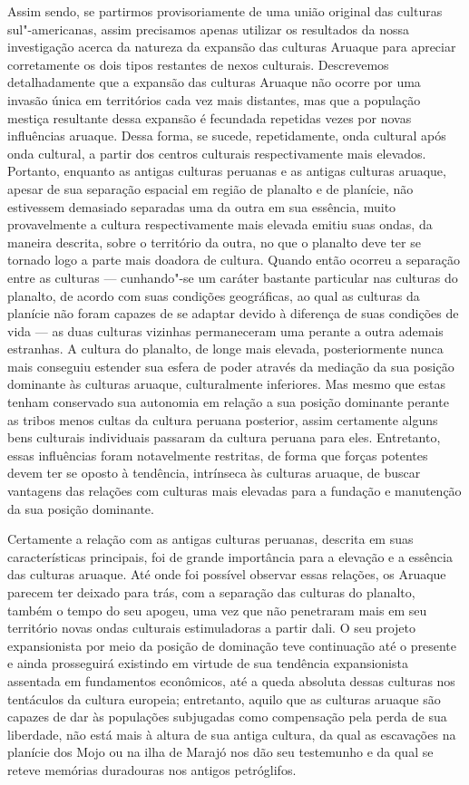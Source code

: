 Assim sendo, se partirmos provisoriamente de uma união original das
culturas sul"-americanas, assim precisamos apenas utilizar os resultados
da nossa investigação acerca da natureza da expansão das culturas
Aruaque para apreciar corretamente os dois tipos restantes de nexos
culturais. Descrevemos detalhadamente que a expansão das culturas
Aruaque não ocorre por uma invasão única em territórios cada vez mais
distantes, mas que a população mestiça resultante dessa expansão é
fecundada repetidas vezes por novas influências aruaque. Dessa forma, se
sucede, repetidamente, onda cultural após onda cultural, a partir dos
centros culturais respectivamente mais elevados. Portanto, enquanto as
antigas culturas peruanas e as antigas culturas aruaque, apesar de sua
separação espacial em região de planalto e de planície, não estivessem
demasiado separadas uma da outra em sua essência, muito provavelmente a
cultura respectivamente mais elevada emitiu suas ondas, da maneira
descrita, sobre o território da outra, no que o planalto deve ter se
tornado logo a parte mais doadora de cultura. Quando então ocorreu a
separação entre as culturas --- cunhando"-se um caráter bastante
particular nas culturas do planalto, de acordo com suas condições
geográficas, ao qual as culturas da planície não foram capazes de se
adaptar devido à diferença de suas condições de vida --- as duas
culturas vizinhas permaneceram uma perante a outra ademais estranhas. A
cultura do planalto, de longe mais elevada, posteriormente nunca mais
conseguiu estender sua esfera de poder através da mediação da sua
posição dominante às culturas aruaque, culturalmente inferiores. Mas
mesmo que estas tenham conservado sua autonomia em relação a sua posição
dominante perante as tribos menos cultas da cultura peruana posterior,
assim certamente alguns bens culturais individuais passaram da cultura
peruana para eles. Entretanto, essas influências foram notavelmente
restritas, de forma que forças potentes devem ter se oposto à tendência,
intrínseca às culturas aruaque, de buscar vantagens das relações com
culturas mais elevadas para a fundação e manutenção da sua posição
dominante.

Certamente a relação com as antigas culturas peruanas, descrita em suas
características principais, foi de grande importância para a elevação e
a essência das culturas aruaque. Até onde foi possível observar essas
relações, os Aruaque parecem ter deixado para trás, com a separação das
culturas do planalto, também o tempo do seu apogeu, uma vez que não
penetraram mais em seu território novas ondas culturais estimuladoras a
partir dali. O seu projeto expansionista por meio da posição de
dominação teve continuação até o presente e ainda prosseguirá existindo
em virtude de sua tendência expansionista assentada em fundamentos
econômicos, até a queda absoluta dessas culturas nos tentáculos da
cultura europeia; entretanto, aquilo que as culturas aruaque são capazes
de dar às populações subjugadas como compensação pela perda de sua
liberdade, não está mais à altura de sua antiga cultura, da qual as
escavações na planície dos Mojo ou na ilha de Marajó nos dão seu
testemunho e da qual se reteve memórias duradouras nos antigos
petróglifos.

